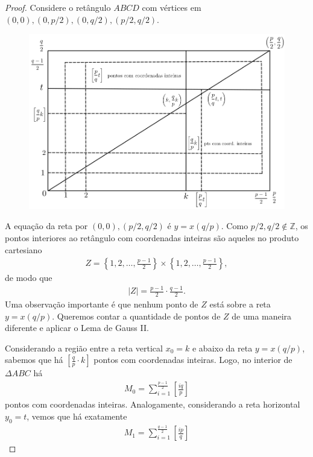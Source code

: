 \documentclass[a4paper,11pt,twoside, leqno]{article}
\theoremstyle{definition}
\begin{document}
\begin{proof}
	Considere o retângulo $ABCD$ com vértices em $(0,0), (0,p/2), (0,q/2), (p/2,q/2)$. 
	\begin{figure}[H]
	    \centering
	    \includegraphics[width=\textwidth]{ImagemTN.png}
	\end{figure}
	A equação da reta por $(0,0), (p/2,q/2)$ é $y = x(q/p)$. Como $p/2,q/2\notin\mathbb{Z}$, os pontos interiores ao retângulo com coordenadas inteiras são aqueles no produto cartesiano
	\begin{align*}
	Z = \left\{ 1,2,\dots,\frac{p-1}{2} \right\}\times\left\{ 1,2,\dots,\frac{p-1}{2} \right\},
	\end{align*}
	de modo que 
	\begin{align*}
	|Z| = \frac{p-1}{2}\cdot\frac{q-1}{2}.
	\end{align*}
	Uma observação importante é que nenhum ponto de $Z$ está sobre a reta $y = x(q/p)$. Queremos contar a quantidade de pontos de $Z$ de uma maneira diferente e aplicar o Lema de Gauss II. 
	\par\vspace{0.3cm} Considerando a região entre a reta vertical $x_0 = k$ e abaixo da reta $y = x(q/p)$, sabemos que há $\displaystyle{ \left[ \frac{q}{p}\cdot k \right] }$ pontos com coordenadas inteiras. Logo, no interior de $\Delta{ABC}$ há
	\begin{align*}
	M_0 = \sum_{i=1}^{\frac{p-1}{2}}\left[ \frac{iq}{p} \right]
	\end{align*} 
	pontos com coordenadas inteiras. Analogamente, considerando a reta horizontal $y_0 = t$, vemos que há exatamente
	\begin{align*}
	M_1 = \sum_{i=1}^{\frac{q-1}{2}}\left[ \frac{ip}{q} \right]

\end{align*}
\end{proof}
\end{document}
